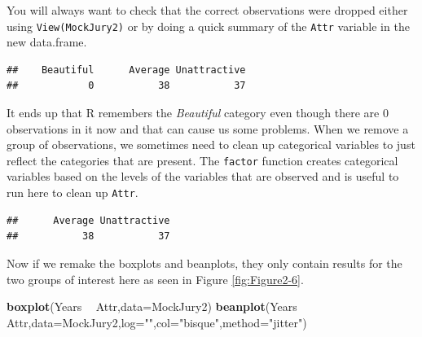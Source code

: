 \documentclass[]{book}
\newenvironment{Shaded}{\begin{snugshade}}{\end{snugshade}}
\newcommand{\KeywordTok}[1]{\textcolor[rgb]{0.13,0.29,0.53}{\textbf{#1}}}
\newcommand{\DataTypeTok}[1]{\textcolor[rgb]{0.13,0.29,0.53}{#1}}
\newcommand{\StringTok}[1]{\textcolor[rgb]{0.31,0.60,0.02}{#1}}
\newcommand{\OperatorTok}[1]{\textcolor[rgb]{0.81,0.36,0.00}{\textbf{#1}}}
\newcommand{\NormalTok}[1]{#1}
\begin{document}
You will always want to check that the correct observations were dropped
either using \texttt{View(MockJury2)} or by doing a quick summary of the
\texttt{Attr} variable in the new data.frame.

\begin{Shaded}
\end{Shaded}

\begin{verbatim}
##    Beautiful      Average Unattractive 
##            0           38           37
\end{verbatim}

It ends up that R remembers the \emph{Beautiful} category even though
there are 0 observations in it now and that can cause us some problems.
When we remove a group of observations, we sometimes need to clean up
categorical variables to just reflect the categories that are present.
The \texttt{factor} function creates categorical variables based on the
levels of the variables that are observed and is useful to run here to
clean up \texttt{Attr}.

\begin{Shaded}
\end{Shaded}

\begin{verbatim}
##      Average Unattractive 
##           38           37
\end{verbatim}

Now if we remake the boxplots and beanplots, they only contain results
for the two groups of interest here as seen in Figure
\ref{fig:Figure2-6}.




\begin{Shaded}
\begin{Highlighting}[]
\KeywordTok{boxplot}\NormalTok{(Years }\OperatorTok{~}\StringTok{ }\NormalTok{Attr,}\DataTypeTok{data=}\NormalTok{MockJury2) }
\KeywordTok{beanplot}\NormalTok{(Years }\OperatorTok{~}\StringTok{ }\NormalTok{Attr,}\DataTypeTok{data=}\NormalTok{MockJury2,}\DataTypeTok{log=}\StringTok{""}\NormalTok{,}\DataTypeTok{col=}\StringTok{"bisque"}\NormalTok{,}\DataTypeTok{method=}\StringTok{"jitter"}\NormalTok{)}
\end{Highlighting}
\end{Shaded}
\end{document}
